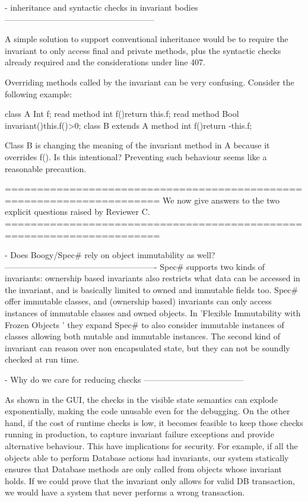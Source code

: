 - inheritance and syntactic checks in invariant bodies
------------------------------------------------------

A simple solution to support conventional inheritance would be to require the invariant to only
access final and private methods,
plus the syntactic checks already required and the considerations under line 407.

Overriding methods called by the invariant can be very confusing.
Consider the following example:

class A{
  Int f;
  read method int f(){return this.f;}
  read method Bool invariant(){this.f()>0;}
}
class B extends A {
  method int f(){return -this.f;}
}

Class B is changing the meaning of the invariant method in A because it overrides f().
Is this intentional? Preventing such behaviour seems like a reasonable precaution.

======================================================================
We now give answers to the two explicit questions raised by Reviewer C.
======================================================================

- Does Boogy/Spec# rely on object immutability as well?
-------------------------------------------------------
Spec# supports two kinds of invariants:  ownership based invariants
 also restricts what data can be accessed in the invariant, and is basically limited
to owned and immutable fields too.
Spec# offer immutable classes, and (ownership based) invariants can only access instances of
immutable classes and owned objects. In 'Flexible Immutability with Frozen Objects
' they expand Spec# to also
consider immutable instances of classes allowing both mutable and immutable instances.
The second kind of invariant can reason over non encapsulated state, but they can not be
soundly checked at run time.

- Why do we care for reducing checks
------------------------------------

As shown in the GUI, the checks in the visible state semantics can explode
exponentially, making the code unusable even for the debugging.
On the other hand, if the cost of runtime checks is low,
it becomes feasible to keep those checks running in production,
to capture invariant failure exceptions and provide alternative behaviour.
This have implications for security.
For example, if all the objects able to perform Database actions had invariants,
our system statically ensures that Database methods are only called from objects whose invariant holds.
If we could prove that the invariant only allows for valid DB transaction, we would have a system
that never performs a wrong transaction.

